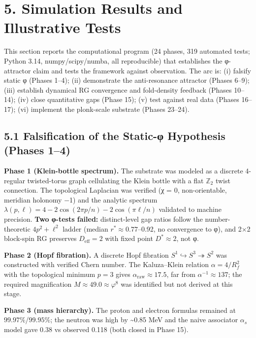 \documentclass[
  11pt,
]{article}
\begin{document}
\section{5. Simulation Results and Illustrative
Tests}\label{simulation-results-and-illustrative-tests}

This section reports the computational program (24 phases, 319 automated
tests; Python 3.14, numpy/scipy/numba, all reproducible) that
establishes the φ-attractor claim and tests the framework against
observation. The arc is: (i) falsify static φ (Phases 1--4); (ii)
demonstrate the anti-resonance attractor (Phases 6--9); (iii) establish
dynamical RG convergence and fold-density feedback (Phases 10--14); (iv)
close quantitative gaps (Phase 15); (v) test against real data (Phases
16--17); (vi) implement the plonk-scale substrate (Phases 23--24).

\subsection{5.1 Falsification of the Static-φ Hypothesis (Phases
1--4)}\label{falsification-of-the-static-ux3c6-hypothesis-phases-14}

\textbf{Phase 1 (Klein-bottle spectrum).} The substrate was modeled as a
discrete 4-regular twisted-torus graph cellulating the Klein bottle with
a flat \(\mathbb{Z}_2\) twist connection. The topological Laplacian was
verified (χ = 0, non-orientable, meridian holonomy −1) and the analytic
spectrum \(\lambda(p,\ell) = 4 - 2\cos(2\pi p/n) - 2\cos(\pi\ell/n)\)
validated to machine precision. \textbf{Two φ-tests failed:}
distinct-level gap ratios follow the number-theoretic \(4p^2 + \ell^2\)
ladder (median \(r^* \approx 0.77\)--0.92, no convergence to φ), and 2×2
block-spin RG preserves \(D_{\text{eff}} = 2\) with fixed point
\(D^* \approx 2\), not φ.

\textbf{Phase 2 (Hopf fibration).} A discrete Hopf fibration
\(S^1 \hookrightarrow S^3 \twoheadrightarrow S^2\) was constructed with
verified Chern number. The Kaluza--Klein relation \(\alpha = 4/R_f^2\)
with the topological minimum \(p = 3\) gives
\(\alpha_{\text{raw}} \approx 17.5\), far from
\(\alpha^{-1} \approx 137\); the required magnification
\(M \approx 49.0 \approx \varphi^8\) was identified but not derived at
this stage.

\textbf{Phase 3 (mass hierarchy).} The proton and electron formulas
remained at \(99.97\%\)/\(99.95\%\); the neutron was high by
\textasciitilde0.85 MeV and the naive associator \(\alpha_s\) model gave
0.38 vs observed 0.118 (both closed in Phase 15).
\end{document}
